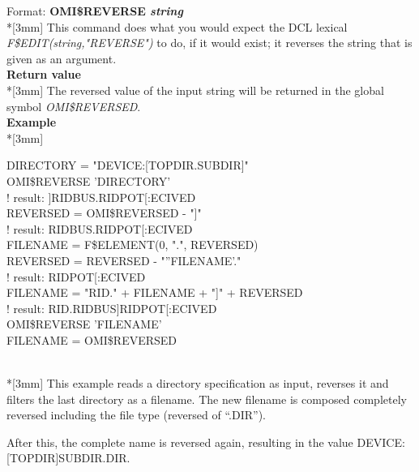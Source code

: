 \documentclass[a4paper]{book}
\renewcommand{\indent}{\hspace*{5mm}}
\begin{document}
\indent Format: \textbf{OMI{\$}REVERSE \textit{string}}\\*[3mm]
This command does what you would expect the DCL lexical 
\linebreak\textit{F{\$}EDIT(string,"REVERSE")} to do, if it would exist; it reverses
the string that is given as an argument.\\[3mm]
\textbf{Return value}\\*[3mm]
The reversed value of the input string will be returned in the global symbol 
\textsl{OMI{\$}REVERSED}.\\[3mm]
\textbf{Example}\\*[3mm]
\begin{small}
\begin{textsf}
\indent{\$} DIRECTORY = "DEVICE:[TOPDIR.SUBDIR]" \\
\indent{\$} OMI{\$}REVERSE 'DIRECTORY'                    \\
\indent{\$}!\hspace{3cm} result: ]RIDBUS.RIDPOT[:ECIVED \\
\indent{\$} REVERSED = OMI{\$}REVERSED - "]"              \\
\indent{\$}!\hspace{3cm} result: RIDBUS.RIDPOT[:ECIVED \\
\indent{\$} FILENAME = F{\$}ELEMENT(0, ".", REVERSED) \\
\indent{\$} REVERSED = REVERSED - "''FILENAME'."          \\
\indent{\$}!\hspace{3cm} result: RIDPOT[:ECIVED \\
\indent{\$} FILENAME = "RID." + FILENAME + "]" + REVERSED \\
\indent{\$}!\hspace{3cm} result: RID.RIDBUS]RIDPOT[:ECIVED \\
\indent{\$} OMI{\$}REVERSE 'FILENAME' \\
\indent{\$} FILENAME = OMI{\$}REVERSED \\
\end{textsf}
\end{small}\\*[3mm]
This example reads a directory specification as input, reverses it and 
filters the last directory as a filename. The new filename is composed 
completely reversed including the file type (reversed of ``.DIR'').

After this, the complete name is reversed again, resulting in the value 
\linebreak DEVICE:[TOPDIR]SUBDIR.DIR.
\end{document}
